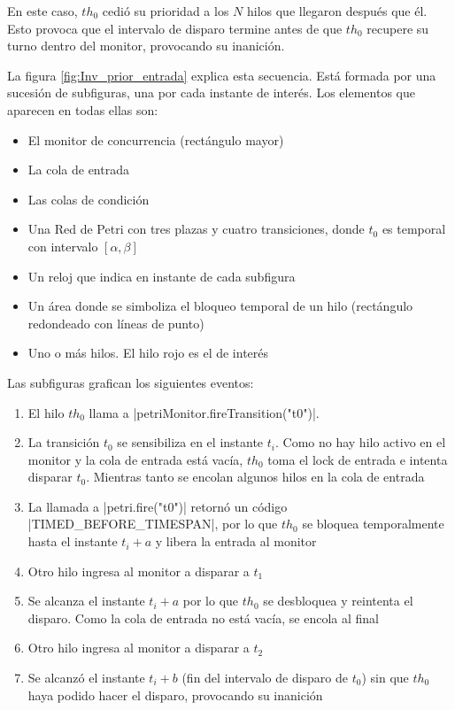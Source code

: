 En este caso, $th_{0}$ cedió su prioridad a los $N$ hilos que llegaron después
que él. Esto provoca que el intervalo de disparo termine antes de que $th_{0}$
recupere su turno dentro del monitor, provocando su inanición.

La figura \ref{fig:Inv_prior_entrada} explica esta secuencia. Está formada por
una sucesión de subfiguras, una por cada instante de interés. Los elementos que
aparecen en todas ellas son:
\begin{itemize}
    \item El monitor de concurrencia (rectángulo mayor)
    \item La cola de entrada
    \item Las colas de condición
    \item Una Red de Petri con tres plazas y cuatro transiciones, donde $t_{0}$
    es temporal con intervalo $[\alpha,\beta]$
    \item Un reloj que indica en instante de cada subfigura
    \item Un área donde se simboliza el bloqueo temporal de un hilo (rectángulo
    redondeado con líneas de punto)
    \item Uno o más hilos. El hilo rojo es el de interés
\end{itemize}

Las subfiguras grafican los siguientes eventos:
\begin{enumerate}[label=\alph*)]
    \item El hilo $th_{0}$ llama a
    |petriMonitor.fireTransition("t0")|. 
    \item La transición $t_{0}$ se sensibiliza en el instante $t_{i}$. Como no
    hay hilo activo en el monitor y la cola de entrada está vacía, $th_{0}$ toma
    el lock de entrada e intenta disparar $t_{0}$. Mientras tanto se encolan
    algunos hilos en la cola de entrada
    \item La llamada a |petri.fire("t0")| retornó un código
    |TIMED_BEFORE_TIMESPAN|, por lo que $th_{0}$ se bloquea
    temporalmente hasta el instante $t_{i}+a$ y libera la entrada al monitor
    \item Otro hilo ingresa al monitor a disparar a $t_{1}$
    \item Se alcanza el instante $t_{i}+a$ por lo que $th_{0}$ se desbloquea y
    reintenta el disparo. Como la cola de entrada no está vacía, se encola al
    final
    \item Otro hilo ingresa al monitor a disparar a $t_{2}$
    \item Se alcanzó el instante $t_{i}+b$ (fin del intervalo de disparo de
    $t_{0}$) sin que $th_{0}$ haya podido hacer el disparo, provocando su
    inanición
\end{enumerate}

